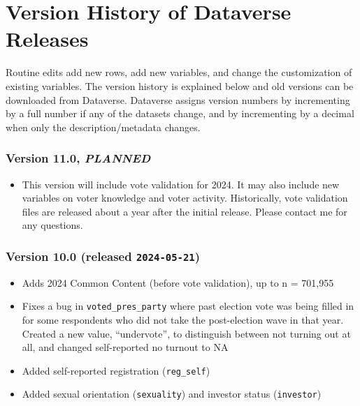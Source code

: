 \documentclass[10pt,article,oneside]{memoir}
\begin{document}
\newpage

\section{Version History of Dataverse
Releases}\label{version-history-of-dataverse-releases}

Routine edits add new rows, add new variables, and change the
customization of existing variables. The version history is explained
below and old versions can be downloaded from Dataverse. Dataverse
assigns version numbers by incrementing by a full number if any of the
datasets change, and by incrementing by a decimal when only the
description/metadata changes.

\subsubsection{\texorpdfstring{Version 11.0,
\emph{PLANNED}}{Version 11.0, PLANNED}}\label{version-11.0-planned}

\begin{itemize}
\tightlist
\item
  This version will include vote validation for 2024. It may also
  include new variables on voter knowledge and voter activity.
  Historically, vote validation files are released about a year after
  the initial release. Please contact me for any questions.
\end{itemize}

\subsubsection{\texorpdfstring{Version 10.0 (released
\texttt{2024-05-21})}{Version 10.0 (released 2024-05-21)}}\label{version-10.0-released-2024-05-21}

\begin{itemize}
\tightlist
\item
  Adds 2024 Common Content (before vote validation), up to n = 701,955
\item
  Fixes a bug in \texttt{voted\_pres\_party} where past election vote
  was being filled in for some respondents who did not take the
  post-election wave in that year. Created a new value, ``undervote'',
  to distinguish between not turning out at all, and changed
  self-reported no turnout to NA
\item
  Added self-reported registration (\texttt{reg\_self})
\item
  Added sexual orientation (\texttt{sexuality}) and investor status
  (\texttt{investor})
\end{itemize}
\end{document}
